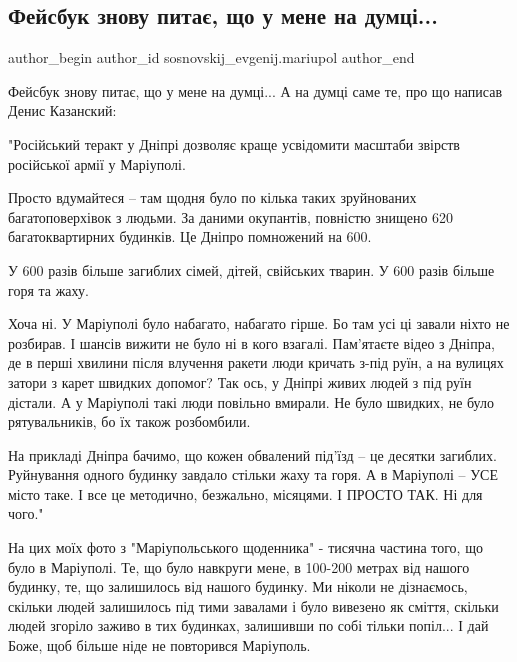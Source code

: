  
 
 
 
 

\subsection{Фейсбук знову питає, що у мене на думці...}
\label{sec:16_01_2023.fb.sosnovskij_evgenij.mariupol.1.feisbuk_znovu_pita__}

\ifcmt
 author_begin
   author_id sosnovskij_evgenij.mariupol
 author_end
\fi

Фейсбук знову питає, що у мене на думці... А на думці саме те, про що написав
Денис Казанский:

"Російський теракт у Дніпрі дозволяє краще усвідомити масштаби звірств
російської армії у Маріуполі.

Просто вдумайтеся – там щодня було по кілька таких зруйнованих багатоповерхівок
з людьми. За даними окупантів, повністю знищено 620 багатоквартирних будинків.
Це Дніпро помножений на 600.

У 600 разів більше загиблих сімей, дітей, свійських тварин. У 600 разів більше
горя та жаху.

Хоча ні. У Маріуполі було набагато, набагато гірше. Бо там усі ці завали ніхто
не розбирав. І шансів вижити не було ні в кого взагалі. Пам'ятаєте відео з
Дніпра, де в перші хвилини після влучення ракети люди кричать з-під руїн, а на
вулицях затори з карет швидких допомог? Так ось, у Дніпрі живих людей з під
руїн дістали. А у Маріуполі такі люди повільно вмирали. Не було швидких, не
було рятувальників, бо їх також розбомбили.

На прикладі Дніпра бачимо, що кожен обвалений під'їзд – це десятки загиблих.
Руйнування одного будинку завдало стільки жаху та горя. А в Маріуполі – УСЕ
місто таке. І все це методично, безжально, місяцями. І ПРОСТО ТАК. Ні для
чого."

На цих моїх фото з "Маріупольського щоденника" - тисячна частина того, що було
в Маріуполі. Те, що було навкруги мене, в 100-200 метрах від нашого будинку,
те, що залишилось від нашого будинку. Ми ніколи не дізнаємось, скільки людей
залишилось під тими завалами і було вивезено як сміття, скільки людей згоріло
заживо в тих будинках, залишивши по собі тільки попіл... І дай Боже, щоб більше
ніде не повторився Маріуполь.
